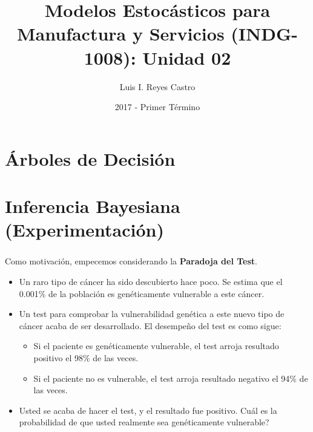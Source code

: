 \documentclass[ 10pt, xcolor = dvipsnames]{beamer}
\title[\shorttitle]{Modelos Estoc\'asticos para Manufactura y Servicios (INDG-1008): \textbf{Unidad 02} }
\author[L. I. Reyes Castro]{Luis I. Reyes Castro}
\institute[ESPOL]{\normalsize Escuela Superior Polit\'ecnica del Litoral (ESPOL) \\ Guayaquil - Ecuador}
\date[2017-T1]{2017 - Primer T\'ermino}
\begin{document}




\section{\'Arboles de Decisi\'on}

\begin{frame}[allowframebreaks]
\frametitle{\insertsection}

\end{frame}

\section{Inferencia Bayesiana (Experimentaci\'on)}

\begin{frame}[allowframebreaks]
\frametitle{\insertsection}

Como motivaci\'on, empecemos considerando la \textbf{Paradoja del Test}. 
\begin{itemize}
\item Un raro tipo de c\'ancer ha sido descubierto hace poco. Se estima que el 0.001\% de la poblaci\'on es gen\'eticamente vulnerable a este c\'ancer. 
\item Un test para comprobar la vulnerabilidad gen\'etica a este nuevo tipo de c\'ancer acaba de ser desarrollado. El desempe\~no del test es como sigue: 
\begin{itemize}
\item Si el paciente es gen\'eticamente vulnerable, el test arroja resultado positivo \linebreak el 98\% de las veces. 
\item Si el paciente no es vulnerable, el test arroja resultado negativo el 94\% \linebreak de las veces. 
\end{itemize}
\item Usted se acaba de hacer el test, y el resultado fue positivo. Cu\'al es la probabilidad de que usted realmente sea gen\'eticamente vulnerable? 
\end{itemize}

\end{frame}
\end{document}
